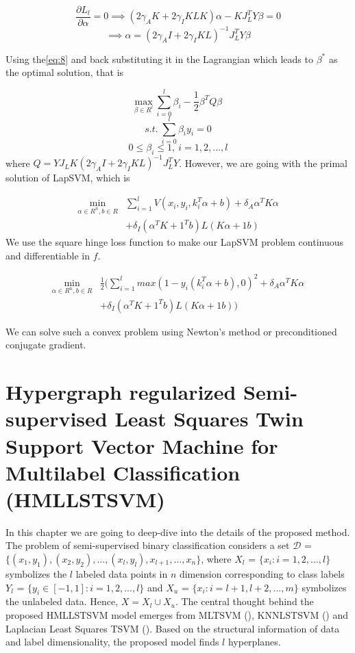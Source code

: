 \documentclass[12pt,a4paper,oneside,english]{report}
\begin{document}
\[
\frac{\partial L_l}{\partial \alpha} = 0 \implies (2\gamma_A K + 2\gamma_I KLK)\alpha - K J_L^T Y \beta = 0
\]
\begin{equation} \label{eq:10}
    \implies \alpha = (2\gamma_A I + 2\gamma_I KL)^{-1}J_L^T Y \beta
\end{equation}
 
Using the\eqref{eq:8} and back substituting it in the Lagrangian which leads to \(\beta^*\) as the optimal solution, that is

\[
 \underset {\beta \in R^l}{\mathrm{max}}\ \sum_{i=0}^l \beta_i - \frac{1}{2} \beta^T Q \beta 
\]
\[
\textit{s.t.} \  \sum_{i=0}^l \beta_i y_i = 0
\]
\[
 0\leq \beta_i \leq 1, \ i=1,2,...,l
\]
where \(Q = Y J_L K (2\gamma_A I + 2\gamma_I KL)^{-1}J_L^T Y \). However, we are going with the primal solution of LapSVM\cite{melacci2011laplacian}, which is 

\begin{equation} \label{eq:11}
\begin{split}
  \underset{\alpha \in R^n,b \in R}{\mathrm{min} } & \sum_{i=1}^l V(x_i,y_i,k_i^T\alpha + b) +  \delta_A\alpha^TK\alpha \\ & + \delta_I(\alpha^TK + 1^Tb)L(K\alpha + 1b)
\end{split}
\end{equation}
We use the square hinge loss function to make our LapSVM problem continuous and differentiable in \( f \).

\begin{equation} \label{eq:12}
\begin{split}
   \underset{\alpha \in R^n,b \in R}{\mathrm{min} } & \frac{1}{2}(\sum_{i=1}^l  max(1-y_i(k_i^T\alpha + b),0)^2  + \delta_A\alpha^TK\alpha \\ & + \delta_I(\alpha^TK + 1^Tb)L(K\alpha + 1b))
\end{split}
\end{equation}

We can solve such a convex problem using Newton's method or preconditioned conjugate gradient.

\newpage
\chapter{Hypergraph regularized Semi-supervised Least Squares Twin Support Vector Machine for Multilabel Classification (HMLLSTSVM)}

In this chapter we are going to deep-dive into the details of the proposed method. The problem of semi-supervised binary classification considers a set $\mathcal{D}$ = $\{\left(x_1, y_1 \right), \left(x_2, y_2\right), \ldots , \left(x_l, y_l\right), x_{l+1}, \ldots , x_n\}$, where $X_l$ = $\{x_i : i =1, 2, \ldots , l\}$ symbolizes the $l$ labeled data points in $n$ dimension corresponding to class labels $Y_l$ = $\{y_i \in \left[-1,1 \right] : i =1, 2, ..., l\}$ and $X_u$ = $\{x_i : i = l+1, l+2, ..., m\}$ symbolizes the unlabeled data. Hence, $X = X_l \cup X_u$.
The central thought behind the proposed HMLLSTSVM model emerges from MLTSVM (\cite{chen2016mltsvm}), KNNLSTSVM (\cite{pan2015k}) and Laplacian Least Squares TSVM (\cite{chen2014laplacian}). 
Based on the structural information of data and label dimensionality, the proposed model finds $l$ hyperplanes.  
\end{document}
